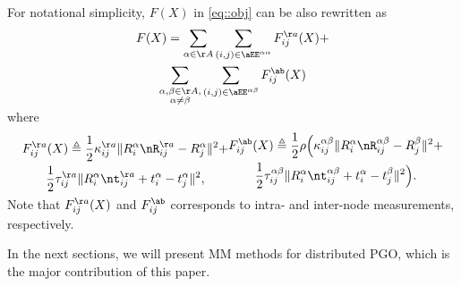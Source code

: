 For notational simplicity, $F(X)$ in \cref{eq::obj} can be also rewritten as  
\begin{multline}\label{eq::F}
	F(X)= \sum_{\alpha\in\AA}\sum_{(i,j)\in \aEE^{\alpha\alpha}}F_{ij}^{\aa}(X)+\\
	\sum_{\substack{\alpha,\beta\in\AA,\\\alpha\neq \beta}}\sum_{(i,j)\in \aEE^{\alpha\beta}} F_{ij}^{\ab}(X)
	\vspace{-0.5em}
\end{multline}
where
\vspace{-0.5em}
\begin{subequations}\label{eq::Faaabij}
\begin{multline}\label{eq::Fij2}
	F_{ij}^{\aa}(X)\triangleq\frac{1}{2}\kappa_{ij}^{\aa}\|R_i^\alpha\nR_{ij}^{\aa} -R_j^\alpha\|^2 +\\ 
	\frac{1}{2}\tau_{ij}^{\aa}\|R_i^\alpha \nt_{ij}^{\aa}+t_i^\alpha - t_j^\alpha\|^2,
\vspace{-0.5em}
\end{multline}
\begin{multline}\label{eq::Fab2}
	F_{ij}^{\ab}(X)\triangleq\frac{1}{2}\rho\Big(\kappa_{ij}^{\alpha\beta}\|R_i^\alpha\nR_{ij}^{\alpha\beta} -R_j^\beta\|^2 +\\ 
	\frac{1}{2}\tau_{ij}^{\alpha\beta}\|R_i^\alpha \nt_{ij}^{\alpha\beta}+t_i^\alpha - t_j^\beta\|^2\Big).
\end{multline}
\end{subequations}
Note that $F_{ij}^{\aa}(X)$ and $F_{ij}^{\ab}$ corresponds to intra- and inter-node measurements, respectively.

In the next sections, we will present MM methods for distributed PGO, which is the major contribution of this paper.
